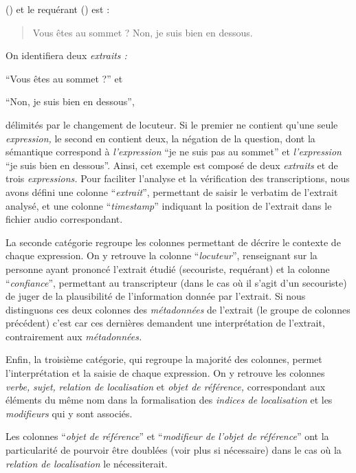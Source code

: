 () et le requérant () est :
%
\begin{quote}
  \begin{dialogue}
    \Sec Vous êtes au sommet ?
    \Req Non, je suis bien en dessous.
  \end{dialogue}
\end{quote}
%
On identifiera deux \emph{extraits :}
%
\begin{enumerate*}[label=(\alph*)]
\item \enquote{Vous êtes au sommet ?} et
\item \enquote{Non, je suis bien en dessous},
\end{enumerate*}
%
délimités par le changement de locuteur. Si le premier ne contient
qu'une seule \emph{expression,} le second en contient deux, la
négation de la question, dont la sémantique correspond à
\emph{l'expression} \enquote{je ne suis pas au sommet} et
\emph{l'expression} \enquote{je suis bien en dessous}. Ainsi, cet
exemple est composé de deux \emph{extraits} et de trois
\emph{expressions.}
%
Pour faciliter l'analyse et la vérification des transcriptions, nous
avons défini une colonne \enquote{\emph{extrait}}, permettant de
saisir le verbatim de l'extrait analysé, et une colonne
\enquote{\emph{timestamp}} indiquant la position de l'extrait dans le
fichier audio correspondant.

La seconde catégorie regroupe les colonnes permettant de décrire le
contexte de chaque expression. On y retrouve la colonne
\enquote{\emph{locuteur}}, renseignant sur la personne ayant prononcé
l'extrait étudié (\eg secouriste, requérant) et la colonne
\enquote{\emph{confiance}}, permettant au transcripteur (dans le cas
où il s'agit d'un secouriste) de juger de la plausibilité de
l'information donnée par l'extrait. Si nous distinguons ces deux
colonnes des \emph{métadonnées} de l'extrait (\ie le groupe de
colonnes précédent) c'est car ces dernières demandent une
interprétation de l'extrait, contrairement aux \emph{métadonnées.}

Enfin, la troisième catégorie, qui regroupe la majorité des colonnes,
permet l'interprétation et la saisie de chaque expression. On y
retrouve les colonnes \emph{verbe,} \emph{sujet,} \emph{relation de
  localisation} et \emph{objet de référence,} correspondant aux
éléments du même nom dans la formalisation des \emph{indices de
  localisation} et les \emph{modifieurs} qui y sont associés.


Les colonnes \enquote{\emph{objet de référence}} et
\enquote{\emph{modifieur de l'objet de référence}} ont la
particularité de pourvoir être doublées (voir plus si nécessaire) dans
le cas où la \emph{relation de localisation} le nécessiterait.

